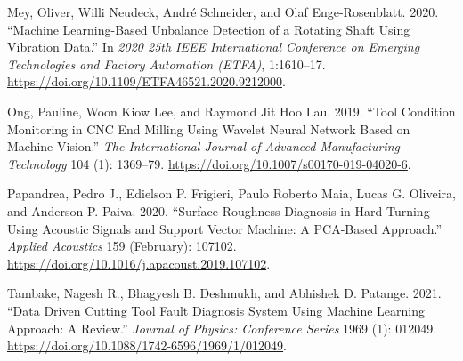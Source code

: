 \documentclass[
  letterpaper,
  DIV=11,
  numbers=noendperiod]{scrartcl}
\newlength{\cslhangindent}
\newlength{\cslentryspacingunit} %
\newenvironment{CSLReferences}[2] %
 {%
  \setlength{\parindent}{0pt}
  \ifodd #1
  \let\oldpar\par
  \def\par{\hangindent=\cslhangindent\oldpar}
  \fi
  \setlength{\parskip}{#2\cslentryspacingunit}
 }%
 {}
\begin{document}
\begin{CSLReferences}{1}{0}
\leavevmode{}%
Mey, Oliver, Willi Neudeck, André Schneider, and Olaf Enge-Rosenblatt.
2020. {``Machine {Learning}-{Based} {Unbalance} {Detection} of a
{Rotating} {Shaft} {Using} {Vibration} {Data}.''} In \emph{2020 25th
{IEEE} {International} {Conference} on {Emerging} {Technologies} and
{Factory} {Automation} ({ETFA})}, 1:1610--17.
\url{https://doi.org/10.1109/ETFA46521.2020.9212000}.

\leavevmode{}%
Ong, Pauline, Woon Kiow Lee, and Raymond Jit Hoo Lau. 2019. {``Tool
Condition Monitoring in {CNC} End Milling Using Wavelet Neural Network
Based on Machine Vision.''} \emph{The International Journal of Advanced
Manufacturing Technology} 104 (1): 1369--79.
\url{https://doi.org/10.1007/s00170-019-04020-6}.

\leavevmode{}%
Papandrea, Pedro J., Edielson P. Frigieri, Paulo Roberto Maia, Lucas G.
Oliveira, and Anderson P. Paiva. 2020. {``Surface Roughness Diagnosis in
Hard Turning Using Acoustic Signals and Support Vector Machine: {A}
{PCA}-Based Approach.''} \emph{Applied Acoustics} 159 (February):
107102. \url{https://doi.org/10.1016/j.apacoust.2019.107102}.

\leavevmode{}%
Tambake, Nagesh R., Bhagyesh B. Deshmukh, and Abhishek D. Patange. 2021.
{``Data {Driven} {Cutting} {Tool} {Fault} {Diagnosis} {System} {Using}
{Machine} {Learning} {Approach}: {A} {Review}.''} \emph{Journal of
Physics: Conference Series} 1969 (1): 012049.
\url{https://doi.org/10.1088/1742-6596/1969/1/012049}.

\end{CSLReferences}
\end{document}
